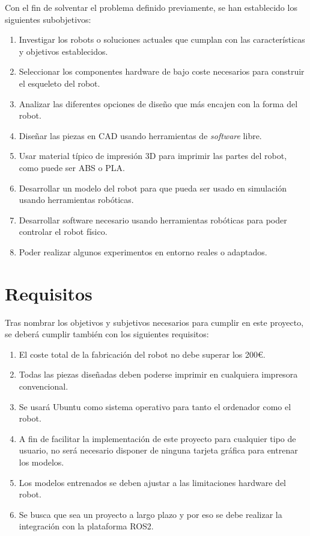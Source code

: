 Con el fin de solventar el problema definido previamente, se han establecido los siguientes subobjetivos:

\begin{enumerate}
	\item{} Investigar los robots o soluciones actuales que cumplan con las características y objetivos establecidos.
	\item{} Seleccionar los componentes hardware de bajo coste necesarios para construir el esqueleto del robot.
	\item{} Analizar las diferentes opciones de diseño que más encajen con la forma del robot.
	\item{} Diseñar las piezas en \acs{CAD} usando herramientas de \textit{software} libre.
	\item{} Usar material típico de impresión 3D para imprimir las partes del robot, como puede ser ABS o PLA. 
	\item{} Desarrollar un modelo del robot para que pueda ser usado en simulación usando herramientas robóticas. 
	\item{} Desarrollar software necesario usando herramientas robóticas para poder controlar el robot físico. 
	\item{} Poder realizar algunos experimentos en entorno reales o adaptados.  
\end{enumerate}
 

\section{Requisitos}
\label{sec:requisitos}

Tras nombrar los objetivos y subjetivos necesarios para cumplir en este proyecto, se deberá cumplir también con los siguientes requisitos: 

\begin{enumerate}
	\item{} El coste total de la fabricación del robot no debe superar los 200€.
	\item{} Todas las piezas diseñadas deben poderse imprimir en cualquiera impresora convencional.
	\item{} Se usará Ubuntu como sistema operativo para tanto el ordenador como el robot.
	\item{} A fin de facilitar la implementación de este proyecto para cualquier tipo de usuario, no será necesario disponer de ninguna tarjeta gráfica para entrenar los modelos. 
	\item{} Los modelos entrenados se deben ajustar a las limitaciones hardware del robot.
	\item{} Se busca que sea un proyecto a largo plazo y por eso se debe realizar la integración con la plataforma ROS2. 
	
	
\end{enumerate}

